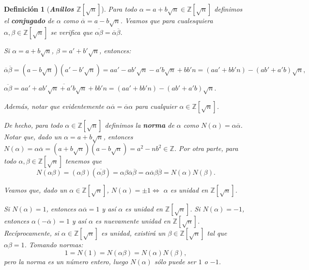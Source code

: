 \documentclass[12pt]{article}
\newtheorem{definition}[theorem]{Definición}
\begin{document}
\begin{definition}[\textbf{\textit{Anillos $\mathbb{Z}[\sqrt{n}]$}}]
Para todo $\alpha = a + b\sqrt{n} \in \mathbb{Z}[\sqrt{n}]$ definimos el \textbf{conjugado} de $\alpha$ como $\overline{\alpha} = a-b\sqrt{n}$. Veamos que para cualesquiera $\alpha, \beta \in \mathbb{Z}[\sqrt{n}]$ se verifica que $\overline{\alpha\beta} = \overline{\alpha}\overline{\beta}$.

Si $\alpha = a + b\sqrt{n}$, $\beta = a'+b'\sqrt{n}$, entonces: \begin{center}$\overline{\alpha}\overline{\beta} = (a-b\sqrt{n})(a'-b'\sqrt{n})=aa'-ab'\sqrt{n}-a'b\sqrt{n}+bb'n = (aa'+bb'n)-(ab'+a'b)\sqrt{n},$\end{center} \begin{center}$\overline{\alpha\beta} = \overline{aa'+ab'\sqrt{n}+a'b\sqrt{n}+bb'n} = (aa'+bb'n)-(ab'+a'b)\sqrt{n}.$\end{center}
Además, notar que evidentemente $\alpha \overline{\alpha} = \overline{\alpha} \alpha$ para cualquier $\alpha \in \mathbb{Z}[\sqrt{n}]$.

De hecho, para todo $\alpha \in \mathbb{Z}[\sqrt{n}]$ definimos la \textbf{norma} de $\alpha$ como $N(\alpha) = \alpha \overline{\alpha}$. Notar que, dado un $\alpha = a + b \sqrt{n}$, entonces $N(\alpha) = \alpha \overline{\alpha} = (a+b\sqrt{n})(a-b\sqrt{n}) = a^2 - nb^2 \in \mathbb{Z}$. Por otra parte, para todo $\alpha, \beta \in \mathbb{Z}[\sqrt{n}]$ tenemos que $$N (\alpha \beta) = (\alpha \beta)(\overline{\alpha\beta}) = \alpha\beta \overline{\alpha}\overline{\beta} = \alpha\overline{\alpha} \beta \overline{\beta} = N(\alpha)N(\beta).$$

Veamos que, dado un $\alpha \in \mathbb{Z}[\sqrt{n}]$, $N(\alpha) = \pm 1 \Leftrightarrow$ $\alpha$ es unidad en $\mathbb{Z}[\sqrt{n}]$.

Si $N(\alpha) = 1$, entonces $\alpha \overline{\alpha} = 1$ y así $\alpha$ es unidad en $\mathbb{Z}[\sqrt{n}]$. Si $N(\alpha) = -1$, entonces $\alpha(-\overline{\alpha}) = 1$ y así $\alpha$ es nuevamente unidad en $\mathbb{Z}[\sqrt{n}]$. Recíprocamente, si $\alpha \in \mathbb{Z}[\sqrt{n}]$ es unidad, existirá un $\beta \in \mathbb{Z}[\sqrt{n}]$ tal que $\alpha \beta = 1$. Tomando normas: $$1 = N(1) = N(\alpha \beta) = N(\alpha)N(\beta),$$ pero la norma es un número entero, luego $N(\alpha)$ sólo puede ser $1$ o $-1$.
\end{definition}
\end{document}
